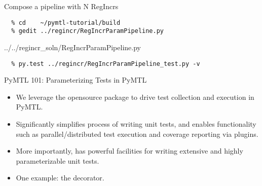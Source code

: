 \begin{task}\begin{frame}[fragile]{Compose a pipeline with N RegIncrs}
\vspace{-0.25in}
\begin{verbatim}
  % cd    ~/pymtl-tutorial/build
  % gedit ../regincr/RegIncrParamPipeline.py
\end{verbatim}

\vspace{-0.3in}
%
{../../regincr_soln/RegIncrParamPipeline.py}

\vspace{-0.3in}
\begin{verbatim}
  % py.test ../regincr/RegIncrParamPipeline_test.py -v
\end{verbatim}
\end{frame}
\end{task}

\begin{frame}{PyMTL 101: Parameterizing Tests in PyMTL}
\begin{itemize}
  \item We leverage the opensource  package to drive test
        collection and execution in PyMTL.
  \item Significantly simplifies process of writing unit tests, and
        enables functionality such as parallel/distributed test execution
        and coverage reporting via plugins.
  \item More importantly,  has powerful facilities for writing
        extensive and highly parameterizable unit tests.
  \item One example: the  decorator.
\end{itemize}
\end{frame}

